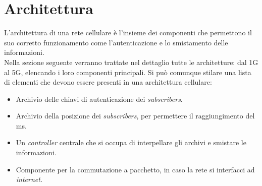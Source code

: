 \clearpage

\section{Architettura}
L'architettura di una rete cellulare è l'insieme dei componenti che permettono il suo corretto funzionamento come l'autenticazione e lo smistamento delle informazioni.\\
Nella sezione seguente verranno trattate nel dettaglio tutte le architetture: dal 1G al 5G, elencando i loro componenti principali. Si può comunque stilare una lista di elementi 
che devono essere presenti in una architettura cellulare:
\begin{itemize}
    \item Archivio delle chiavi di autenticazione dei \textit{subscribers}.
    \item Archivio della posizione dei \textit{subscribers}, per permettere il raggiungimento del \gls{ms}.
    \item Un \textit{controller} centrale che si occupa di interpellare gli archivi e smistare le informazioni.
    \item Componente per la commutazione a pacchetto, in caso la rete si interfacci ad \textit{internet}.
\end{itemize}